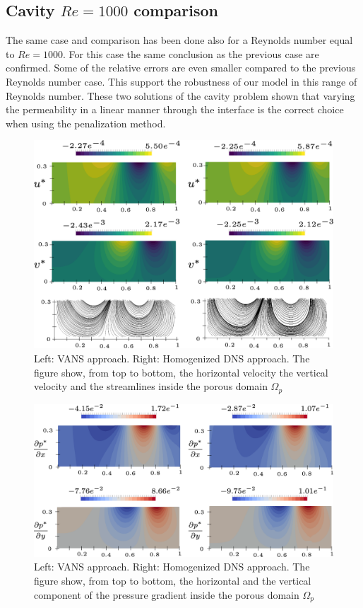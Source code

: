 \subsection{Cavity $Re=1000$ comparison}

The same case and comparison has been done also for a Reynolds number equal to $Re=1000$.
For this case the same conclusion as the previous case are confirmed. Some of the relative errors are even smaller compared to the previous Reynolds number case. This support the robustness of our model in this range of Reynolds number.
These two solutions of the cavity problem shown that varying the permeability in a linear manner through the interface is the correct choice when using the penalization method.

\begin{figure}[H]
	\centering
	\includegraphics[width=1\linewidth]{chapter_5/figure/re1000/vans_u}
	\caption{Left: VANS approach. Right: Homogenized DNS approach. The figure show, from top to bottom, the horizontal velocity the vertical velocity and the streamlines inside the porous domain $\Omega_p$}
	\label{fig:1000_u}
\end{figure}

\begin{figure}[H]
	\centering
	\includegraphics[width=1\linewidth]{chapter_5/figure/re1000/vans_p}
	\caption{Left: VANS approach. Right: Homogenized DNS approach. The figure show, from top to bottom, the horizontal and the vertical component of the pressure gradient inside the porous domain $\Omega_p$}
	\label{fig:1000_p}
\end{figure}


